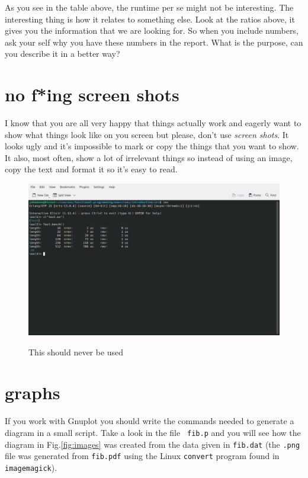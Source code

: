 \documentclass[a4paper,11pt]{article}
\begin{document}
As you see in the table above, the runtime per se might not be
interesting. The interesting thing is how it relates to something
else. Look at the ratios above, it gives you the information that we
are looking for. So when you include numbers, ask your self why you
have these numbers in the report. What is the purpose, can you
describe it in a better way?


\section*{no f*ing screen shots}

I know that you are all very happy that things actually work and
eagerly want to show what things look like on you screen but please,
don't use {\em screen shots}. It looks ugly and it's impossible to mark or
copy the things that you want to show. It also, most often, show a lot
of irrelevant things so instead of using an image, copy the text and
format it so it's easy to read.

\begin{figure}
  \centering
  \includegraphics[scale=0.45]{screenshot.png}
  \label{fig:screenshot}
  \caption{This should never be used}
\end{figure}



\section*{graphs}


If you work with Gnuplot you should write the commands needed to
generate a diagram in a small script. Take a look in the file {\tt
  fib.p} and you will see how the diagram in Fig.\ref{fig:images} was
created from the data given in {\tt fib.dat} (the {\tt .png} file was
generated from {\tt fib.pdf} using the Linux {\tt convert}
program found in {\tt imagemagick}).
\end{document}
